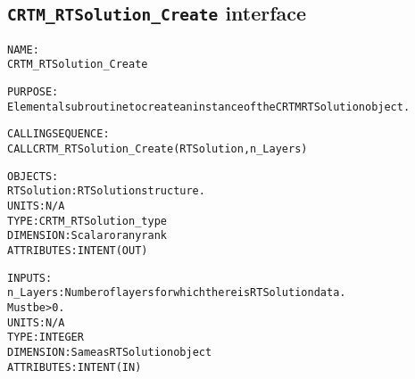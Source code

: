 \subsection{\texttt{CRTM\_RTSolution\_Create} interface}
  \label{sec:CRTM_RTSolution_Create_interface}
  \begin{alltt}
 
  NAME:
        CRTM_RTSolution_Create
  
  PURPOSE:
        Elemental subroutine to create an instance of the CRTM RTSolution object.
 
  CALLING SEQUENCE:
        CALL CRTM_RTSolution_Create( RTSolution, n_Layers )
 
  OBJECTS:
        RTSolution:   RTSolution structure.
                      UNITS:      N/A
                      TYPE:       CRTM_RTSolution_type
                      DIMENSION:  Scalar or any rank
                      ATTRIBUTES: INTENT(OUT)
 
  INPUTS:
        n_Layers:     Number of layers for which there is RTSolution data.
                      Must be > 0.
                      UNITS:      N/A
                      TYPE:       INTEGER
                      DIMENSION:  Same as RTSolution object
                      ATTRIBUTES: INTENT(IN)
 
  \end{alltt}
